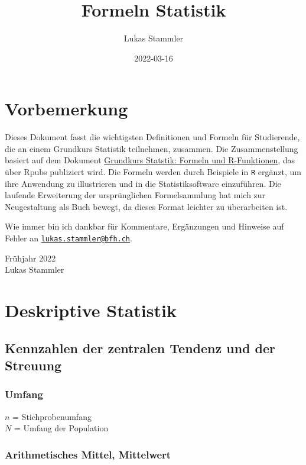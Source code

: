\documentclass[
]{book}
\title{Formeln Statistik}
\author{Lukas Stammler}
\date{2022-03-16}
\begin{document}
\maketitle

{
\setcounter{tocdepth}{1}
\tableofcontents
}
\hypertarget{vorbemerkung}{%
\chapter{Vorbemerkung}\label{vorbemerkung}}

Dieses Dokument fasst die wichtigsten Definitionen und Formeln für Studierende, die an einem Grundkurs Statistik teilnehmen, zusammen. Die Zusammenstellung basiert auf dem Dokument \href{https://rpubs.com/stammler/851041}{Grundkurs Statstik: Formeln und R-Funktionen}, das über Rpubs publiziert wird.
Die Formeln werden durch Beispiele in \texttt{R} ergänzt, um ihre Anwendung zu illustrieren und in die Statistiksoftware einzuführen. Die laufende Erweiterung der ursprünglichen Formelsammlung hat mich zur Neugestaltung als Buch bewegt, da dieses Format leichter zu überarbeiten ist.

Wie immer bin ich dankbar für Kommentare, Ergänzungen und Hinweise auf Fehler an \href{mailto:lukas.stammler@bfh.ch}{\nolinkurl{lukas.stammler@bfh.ch}}.

Frühjahr 2022\\
Lukas Stammler

\hypertarget{Deskriptive}{%
\chapter{Deskriptive Statistik}\label{Deskriptive}}

\hypertarget{kennzahlen-der-zentralen-tendenz-und-der-streuung}{%
\section{Kennzahlen der zentralen Tendenz und der Streuung}\label{kennzahlen-der-zentralen-tendenz-und-der-streuung}}

\hypertarget{umfang}{%
\subsection{Umfang}\label{umfang}}

\(n\) = Stichprobenumfang\\
\(N\) = Umfang der Population

\hypertarget{arithmetisches-mittel-mittelwert}{%
\subsection{Arithmetisches Mittel, Mittelwert}\label{arithmetisches-mittel-mittelwert}}
\end{document}

